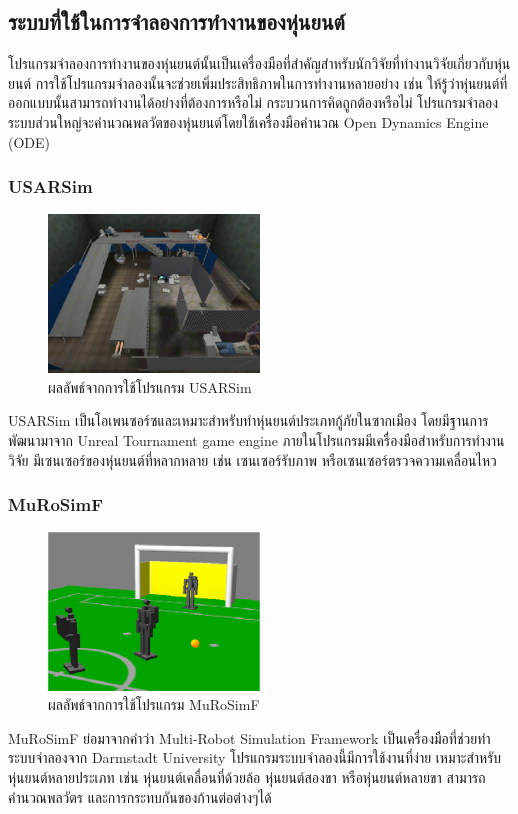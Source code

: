 \clearpage
\subsection{ระบบที่ใช้ในการจำลองการทำงานของหุ่นยนต์}
โปรแกรมจำลองการทำงานของหุ่นยนต์นั้นเป็นเครื่องมือที่สำคัญสำหรับนักวิจัยที่ทำงานวิจัยเกี่ยวกับหุ่นยนต์ การใช้โปรแกรมจำลองนั้นจะช่วยเพิ่มประสิทธิภาพในการทำงานหลายอย่าง
เช่น ให้รู้ว่าหุ่นยนต์ที่ออกแบบนั้นสามารถทำงานได้อย่างที่ต้องการหรือไม่ กระบวนการคิดถูกต้องหรือไม่
โปรแกรมจำลองระบบส่วนใหญ่จะคำนวณพลวัตของหุ่นยนต์โดยใช้เครื่องมือคำนวณ Open Dynamics Engine (ODE)

\subsubsection*{USARSim}
\begin{figure}[!ht]
	\centering
	\includegraphics[width=0.5\textwidth]{chapter2/images/sim_USARSim.jpg}
    \caption{ผลลัพธ์จากการใช้โปรแกรม USARSim}
    \label{fig:sim_USARSim}
\end{figure}
USARSim เป็นโอเพนซอร์ซและเหมาะสำหรับทำหุ่นยนต์ประเภทกู้ภัยในซากเมือง โดยมีฐานการพัฒนามาจาก 
Unreal Tournament game engine ภายในโปรแกรมมีเครื่องมือสำหรับการทำงานวิจัย มีเซนเซอร์ของหุ่นยนต์ที่หลากหลาย 
เช่น เซนเซอร์รับภาพ หรือเซนเซอร์ตรวจความเคลื่อนไหว

\subsubsection*{MuRoSimF}
\begin{figure}[!ht]
    \centering
    \includegraphics[width=0.5\textwidth]{chapter2/images/sim_MuRoSimF.png}
    \caption{ผลลัพธ์จากการใช้โปรแกรม MuRoSimF}
    \label{fig:sim_MuRoSimF}
\end{figure}
MuRoSimF ย่อมาจากคำว่า Multi-Robot Simulation Framework เป็นเครื่องมือที่ช่วยทำระบบจำลองจาก
Darmstadt University โปรแกรมระบบจำลองนี้มีการใช้งานที่ง่าย เหมาะสำหรับหุ่นยนต์หลายประเภท เช่น
หุ่นยนต์เคลื่อนที่ด้วยล้อ หุ่นยนต์สองขา หรือหุ่นยนต์หลายขา สามารถคำนวณพลวัตร และการกระทบกันของก้านต่อต่างๆได้

